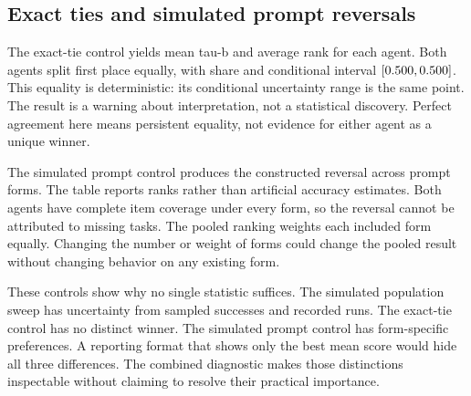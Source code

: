 \documentclass{article}
\begin{document}
\subsection{Exact ties and simulated prompt reversals}
The exact-tie control yields mean tau-b \TieTau{} and average rank \TieRank{} for each agent. Both agents split first place equally, with share \TieShare{} and conditional interval $[0.500{},0.500{}]$. This equality is deterministic: its conditional uncertainty range is the same point. The result is a warning about interpretation, not a statistical discovery. Perfect agreement here means persistent equality, not evidence for either agent as a unique winner.\par

The simulated prompt control produces the constructed reversal across prompt forms. The table reports ranks rather than artificial accuracy estimates. Both agents have complete item coverage under every form, so the reversal cannot be attributed to missing tasks. The pooled ranking weights each included form equally. Changing the number or weight of forms could change the pooled result without changing behavior on any existing form.\par
These controls show why no single statistic suffices. The simulated population sweep has uncertainty from sampled successes and recorded runs. The exact-tie control has no distinct winner. The simulated prompt control has form-specific preferences. A reporting format that shows only the best mean score would hide all three differences. The combined diagnostic makes those distinctions inspectable without claiming to resolve their practical importance.\par
\end{document}
